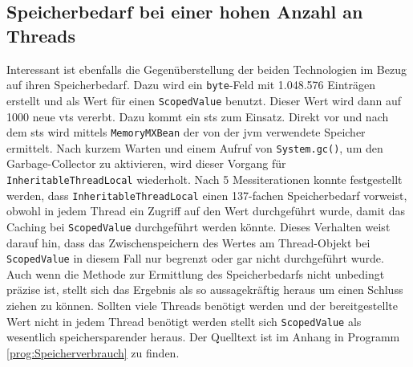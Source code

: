 \subsection{Speicherbedarf bei einer hohen Anzahl an Threads}
\label{sec:Speicherbedarf}

    Interessant ist ebenfalls die Gegenüberstellung der beiden Technologien im Bezug auf ihren Speicherbedarf. Dazu wird ein \texttt{byte}-Feld mit 1.048.576 Einträgen erstellt und als Wert für einen
    \texttt{ScopedValue} benutzt. Dieser Wert wird dann auf 1000 neue \Glspl{vt} vererbt. Dazu kommt ein \gls{sts} zum Einsatz. Direkt vor und nach dem \gls{sts} wird mittels 
    \texttt{MemoryMXBean} der von der \gls{jvm} verwendete Speicher ermittelt. Nach kurzem Warten und einem Aufruf von \texttt{System.gc()}, um den Garbage-Collector zu aktivieren, wird 
    dieser Vorgang für \texttt{InheritableThreadLocal} wiederholt. Nach 5 Messiterationen konnte festgestellt werden, dass \texttt{InheritableThreadLocal} einen 137-fachen Speicherbedarf 
    vorweist, obwohl in jedem Thread ein Zugriff auf den Wert durchgeführt wurde, damit das Caching bei \texttt{ScopedValue} durchgeführt werden könnte. Dieses Verhalten weist darauf hin, dass
    das Zwischenspeichern des Wertes am Thread-Objekt bei \texttt{ScopedValue} in diesem Fall nur begrenzt oder gar nicht durchgeführt wurde. Auch wenn die Methode zur Ermittlung des Speicherbedarfs 
    nicht unbedingt präzise ist, stellt sich das Ergebnis als so aussagekräftig heraus um einen Schluss ziehen zu können. Sollten viele Threads benötigt werden und der bereitgestellte Wert 
    nicht in jedem Thread benötigt werden stellt sich \texttt{ScopedValue} als wesentlich speichersparender heraus. Der Quelltext ist im Anhang in Programm \ref{prog:Speicherverbrauch} zu finden.
